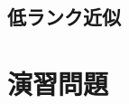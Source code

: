 \documentclass[../../main]{subfiles}
\begin{document}
\begin{subappendices}
\section{低ランク近似}
\end{subappendices}

\section*{演習問題}
\end{document}
